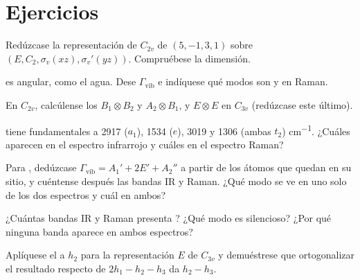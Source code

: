 \section{Ejercicios}

\begin{exercise}[$\star$]\label{exo:b3:group-theory-applied:1}
Redúzcase la representación de $C_{2v}$ de  $(5, -1, 3, 1)$ sobre $(E, C_2,
\sigma_v(xz), \sigma_v'(yz))$. Compruébese la dimensión.
\end{exercise}

\begin{exercise}[$\star$]\label{exo:b3:group-theory-applied:2}
 es angular, como el agua. Dese $\Gamma_{\mathrm{vib}}$ e indíquese qué modos son 
y en Raman.
\end{exercise}

\begin{exercise}[$\star$]\label{exo:b3:group-theory-applied:3}
En $C_{2v}$, calcúlense los  $B_1\otimes B_2$ y $A_2\otimes B_1$, y
$E\otimes E$ en $C_{3v}$ (redúzcase este último).
\end{exercise}

\begin{exercise}[$\star$]\label{exo:b3:group-theory-applied:4}
 tiene fundamentales a 2917 ($a_1$), 1534 ($e$), 3019 y 1306 (ambas $t_2$)
\unit{cm^{-1}}. ¿Cuáles aparecen en el espectro infrarrojo y cuáles en el espectro
Raman?
\end{exercise}

\begin{exercise}[$\star\star$]\label{exo:b3:group-theory-applied:5}
Para , dedúzcase $\Gamma_{\mathrm{vib}} = A_1' + 2E' + A_2''$ a partir de los átomos que quedan en
su sitio, y cuéntense después las bandas IR y Raman. ¿Qué modo se ve en uno solo de
los dos espectros y cuál en ambos?
\end{exercise}

\begin{exercise}[$\star\star$]\label{exo:b3:group-theory-applied:6}
¿Cuántas bandas IR y Raman presenta ? ¿Qué modo es silencioso? ¿Por qué
ninguna banda aparece en ambos espectros?
\end{exercise}

\begin{exercise}[$\star\star$]\label{exo:b3:group-theory-applied:7}
Aplíquese el  a $h_2$ para la representación $E$ de $C_{3v}$ y
demuéstrese que ortogonalizar el resultado respecto de $2h_1 - h_2 - h_3$ da $h_2 - h_3$.
\end{exercise}


